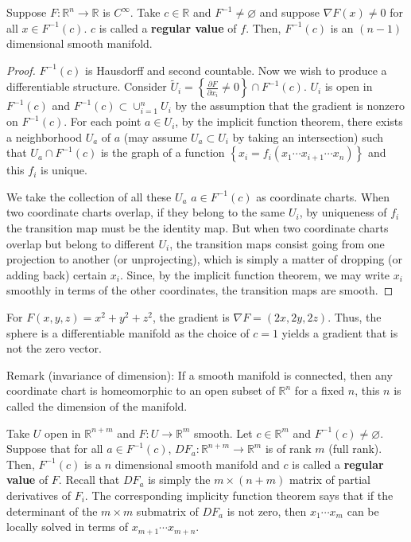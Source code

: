 \documentclass{../mathnotes}
\begin{document}
\begin{thm}
    Suppose $F:\mathbb{R}^n\to\mathbb{R}$ is $C^\infty$. Take $c\in\mathbb{R}$ and $F^{-1}\neq \varnothing$ and suppose $\nabla F(x)\neq0$ for all $x\in F^{-1}(c)$. $c$ is called
    a \textbf{regular value} of $f$. Then, $F^{-1}(c)$ is an $(n-1)$ dimensional smooth manifold.
\end{thm}
\begin{proof}
    $F^{-1}(c)$ is Hausdorff and second countable. Now we wish to produce a differentiable structure. Consider $\tilde{U}_i=\left\{ \frac{\partial F}{\partial x_i}\neq0 \right\}\cap F^{-1}(c)$.
    $U_i$ is open in $F^{-1}(c)$ and $F^{-1}(c)\subset\cup_{i=1}^nU_i$ by the assumption that the gradient is nonzero on $F^{-1}(c)$. For each point $a\in U_i$, by the
    implicit function theorem, there exists a neighborhood $U_a$ of $a$ (may assume $U_a\subset U_i$ by taking an intersection) such that $U_a\cap F^{-1}(c)$ is the graph
    of a function $\left\{ x_i=f_i(x_1\cdots x_{i+1}\cdots x_n) \right\}$ and this $f_i$ is unique.

    We take the collection of all these $U_a$ $a\in F^{-1}(c)$ as coordinate charts. When two coordinate charts overlap, if they belong to the same $U_i$, by uniqueness
    of $f_i$ the transition map must be the identity map. But when two coordinate charts overlap but belong to different $U_i$, the transition maps consist 
    going from one projection to another (or unprojecting), which is simply a matter of dropping (or adding back) certain $x_i$. Since, by the implicit function theorem, 
    we may write $x_i$ smoothly in terms of the other coordinates, the transition maps are smooth.
\end{proof}

For $F(x,y,z)=x^2+y^2+z^2$, the gradient is $\nabla F=(2x, 2y, 2z)$. Thus, the sphere is a differentiable manifold as the choice of $c=1$ yields a gradient
that is not the zero vector.

Remark (invariance of dimension): If a smooth manifold is connected, then any coordinate chart is homeomorphic to an open subset of $\mathbb{R}^n$ for a fixed $n$, this $n$ is called
the dimension of the manifold.

\begin{thm}
    Take $U$ open in $\mathbb{R}^{n+m}$ and $F:U\to\mathbb{R}^m$ smooth. Let $c\in\mathbb{R}^m$ and $F^{-1}(c)\neq\varnothing$. Suppose that for all $a\in F^{-1}(c)$,
    $DF_a:\mathbb{R}^{n+m}\to\mathbb{R}^m$ is of rank $m$ (full rank). Then, $F^{-1}(c)$ is a $n$ dimensional smooth manifold and $c$ is called a \textbf{regular value}
    of $F$. Recall that $DF_a$ is simply the $m\times(n+m)$ matrix of partial derivatives of $F_i$. The corresponding implicity function theorem says that if
    the determinant of the $m\times m$ submatrix of $DF_a$ is not zero, then $x_1\cdots x_m$ can be locally solved in terms of $x_{m+1}\cdots x_{m+n}$.
\end{thm}
\end{document}
